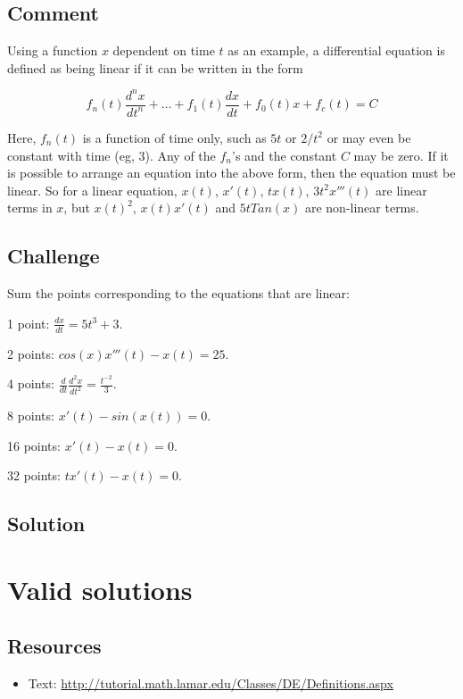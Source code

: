 \subsection*{Comment}
Using a function $x$ dependent on time $t$ as an example, a differential equation is defined as being linear if it can be written in the form

\begin{equation}
    f_n(t) \frac{d^nx}{d t^n} + \dots + f_1(t) \frac{dx}{dt} + f_0(t) x + f_c(t) = C
\end{equation}

Here, $f_n(t)$ is a function of time only, such as $5t$ or $2/t^2$ or may even be constant with time (eg, $3$).
Any of the $f_n$'s and the constant $C$ may be zero.
If it is possible to arrange an equation into the above form, then the equation must be linear.
So for a linear equation, $x(t)$, $x'(t)$, $t x(t)$, $3t^2 x'''(t)$ are linear terms in $x$, but $x(t)^2$, $x(t) x'(t)$ and $5 t Tan(x)$ are non-linear terms.

\subsection*{Challenge}
Sum the points corresponding to the equations that are linear:

1 point: $\displaystyle \frac{dx}{dt} = 5t^3 + 3$.

2 points: $\displaystyle cos(x) x'''(t) - x(t) = 25$.

4 points: $\displaystyle \frac{d}{dt} \frac{d^2 x}{dt^2} = \frac{t^{-2}}{3}$.

8 points: $\displaystyle x'(t) - sin(x(t)) = 0$.

16 points: $\displaystyle x'(t) - x(t) = 0$.

32 points: $\displaystyle t x'(t) - x(t) = 0$.

\subsection*{Solution}
\six{}





\newpage

\section{Valid solutions}

\subsection*{Resources}
\begin{itemize}
    \item Text: \url{http://tutorial.math.lamar.edu/Classes/DE/Definitions.aspx}
\end{itemize}

